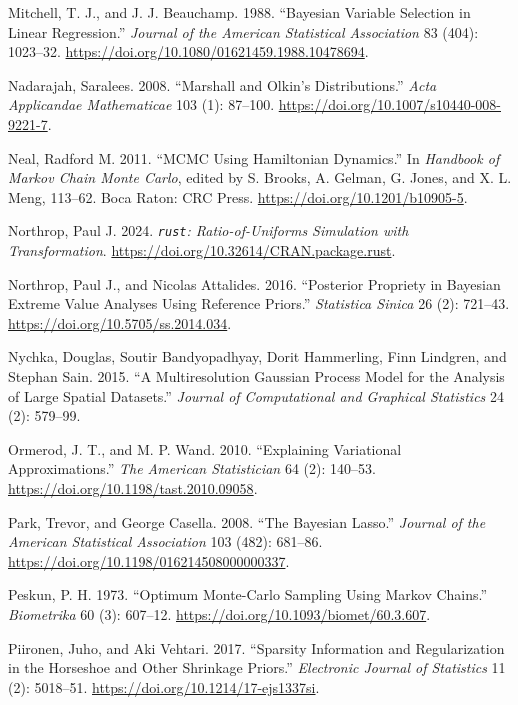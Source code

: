 \documentclass[
  11pt,
  letterpaper,
]{scrbook}
\newlength{\cslhangindent}
\newenvironment{CSLReferences}[2] %
 {\begin{list}{}{%
  \setlength{\itemindent}{0pt}
  \setlength{\leftmargin}{0pt}
  \setlength{\parsep}{0pt}
  \ifodd #1
   \setlength{\leftmargin}{\cslhangindent}
   \setlength{\itemindent}{-1\cslhangindent}
  \fi
  \setlength{\itemsep}{#2\baselineskip}}}
 {\end{list}}
\theoremstyle{definition}
\theoremstyle{definition}
\theoremstyle{definition}
\theoremstyle{plain}
\theoremstyle{plain}
\theoremstyle{plain}
\theoremstyle{remark}
\begin{document}
\begin{CSLReferences}{1}{0}
Mitchell, T. J., and J. J. Beauchamp. 1988. {``Bayesian Variable
Selection in Linear Regression.''} \emph{Journal of the American
Statistical Association} 83 (404): 1023--32.
\url{https://doi.org/10.1080/01621459.1988.10478694}.

Nadarajah, Saralees. 2008. {``{M}arshall and {O}lkin's Distributions.''}
\emph{Acta Applicandae Mathematicae} 103 (1): 87--100.
\url{https://doi.org/10.1007/s10440-008-9221-7}.

Neal, Radford M. 2011. {``{MCMC} Using {H}amiltonian Dynamics.''} In
\emph{Handbook of {M}arkov Chain {M}onte {C}arlo}, edited by S. Brooks,
A. Gelman, G. Jones, and X. L. Meng, 113--62. Boca Raton: CRC Press.
\url{https://doi.org/10.1201/b10905-5}.

Northrop, Paul J. 2024. \emph{\texttt{rust}: Ratio-of-Uniforms
Simulation with Transformation}.
\url{https://doi.org/10.32614/CRAN.package.rust}.

Northrop, Paul J., and Nicolas Attalides. 2016. {``Posterior Propriety
in {B}ayesian Extreme Value Analyses Using Reference Priors.''}
\emph{Statistica Sinica} 26 (2): 721--43.
\url{https://doi.org/10.5705/ss.2014.034}.

Nychka, Douglas, Soutir Bandyopadhyay, Dorit Hammerling, Finn Lindgren,
and Stephan Sain. 2015. {``A Multiresolution {G}aussian Process Model
for the Analysis of Large Spatial Datasets.''} \emph{Journal of
Computational and Graphical Statistics} 24 (2): 579--99.

Ormerod, J. T., and M. P. Wand. 2010. {``Explaining Variational
Approximations.''} \emph{The American Statistician} 64 (2): 140--53.
\url{https://doi.org/10.1198/tast.2010.09058}.

Park, Trevor, and George Casella. 2008. {``The {B}ayesian {L}asso.''}
\emph{Journal of the American Statistical Association} 103 (482):
681--86. \url{https://doi.org/10.1198/016214508000000337}.

Peskun, P. H. 1973. {``Optimum {M}onte-{C}arlo Sampling Using {M}arkov
Chains.''} \emph{Biometrika} 60 (3): 607--12.
\url{https://doi.org/10.1093/biomet/60.3.607}.

Piironen, Juho, and Aki Vehtari. 2017. {``Sparsity Information and
Regularization in the Horseshoe and Other Shrinkage Priors.''}
\emph{Electronic Journal of Statistics} 11 (2): 5018--51.
\url{https://doi.org/10.1214/17-ejs1337si}.


\end{CSLReferences}
\end{document}
